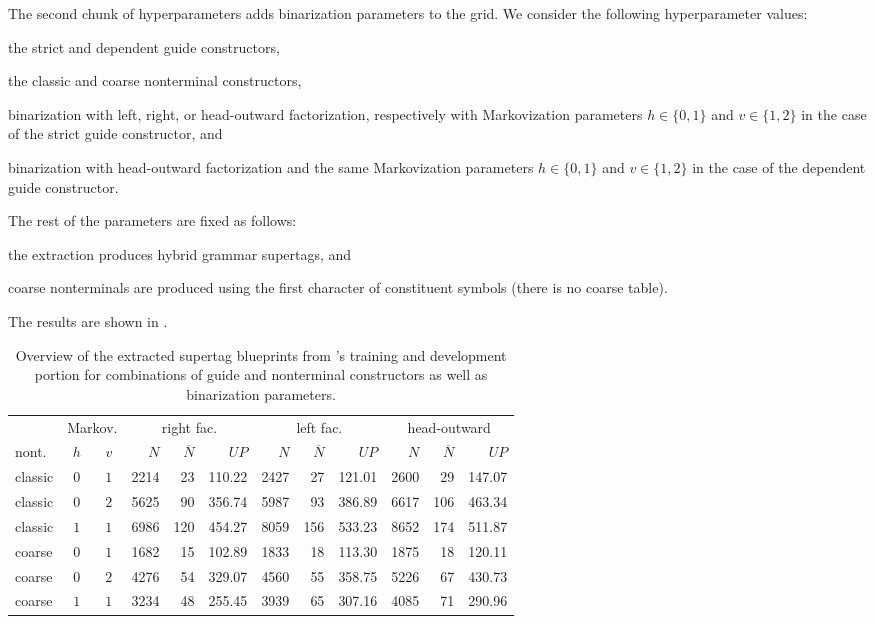 \documentclass[../../document.tex]{subfiles}
\begin{document}
    The second chunk of hyperparameters adds binarization parameters to the grid.
    We consider the following hyperparameter values:
    \begin{compactitem}
        \item the strict and dependent guide constructors,
        \item the classic and coarse nonterminal constructors,
        \item binarization with left, right, or head-outward factorization, respectively with Markovization parameters \(h \in \{0,1\}\) and \(v \in \{1,2\}\) in the case of the strict guide constructor, and
        \item binarization with head-outward factorization and the same Markovization parameters \(h \in \{0,1\}\) and \(v \in \{1,2\}\) in the case of the dependent guide constructor.
    \end{compactitem}
    The rest of the parameters are fixed as follows:
    \begin{compactitem}
        \item the extraction produces hybrid grammar supertags, and
        \item coarse nonterminals are produced using the first character of constituent symbols (there is no coarse table).
    \end{compactitem}
    The results are shown in .
    
    \begin{table}
        \caption{\label{tbl:gridsearch:2:1}
            Overview of the extracted supertag blueprints from \negra{}'s training and development portion for combinations of guide and nonterminal constructors as well as binarization parameters.
        }
        \centering
        \vspace{.2cm}
        \begin{tabular}{lcc|rrr|rrr|rrr}
            \toprule
& \multicolumn{2}{c|}{Markov.}         & \multicolumn{3}{c|}{right fac.} & \multicolumn{3}{c|}{left fac.} & \multicolumn{3}{c}{head-outward}  \\
nont.  & \(h\) &\(v\)        & $N$ & $\overline{N}$ & $\mathit{UP}$ & $N$ & $\overline{N}$ & $\mathit{UP}$ & $N$ & $\overline{N}$ & $\mathit{UP}$  \\ \hline
classic & \(0\) & \(1\)    & 2214 & 23 & 110.22 & 2427 & 27 & 121.01 & 2600 & 29 & 147.07  \\
classic & \(0\) & \(2\)    & 5625 & 90 & 356.74 & 5987 & 93 & 386.89 & 6617 & 106 & 463.34  \\
classic & \(1\) & \(1\)    & 6986 & 120 & 454.27 & 8059 & 156 & 533.23 & 8652 & 174 & 511.87 \\\hline
coarse  & \(0\) & \(1\)    & 1682 & 15 & 102.89 & 1833 & 18 & 113.30 & 1875 & 18 & 120.11  \\
coarse  & \(0\) & \(2\)    & 4276 & 54 & 329.07 & 4560 & 55 & 358.75 & 5226 & 67 & 430.73  \\
coarse  & \(1\) & \(1\)    & 3234 & 48 & 255.45 & 3939 & 65 & 307.16 & 4085 & 71 & 290.96 \\
\bottomrule
        \end{tabular}
    \end{table}
\end{document}
